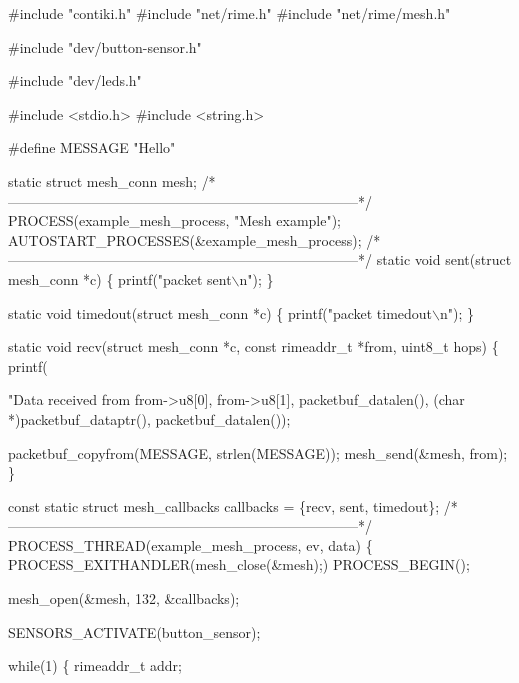 \begin{DoxyCodeInclude}
\textcolor{preprocessor}{#include "contiki.h"}
\textcolor{preprocessor}{#include "net/rime.h"}
\textcolor{preprocessor}{#include "net/rime/mesh.h"}

\textcolor{preprocessor}{#include "dev/button-sensor.h"}

\textcolor{preprocessor}{#include "dev/leds.h"}

\textcolor{preprocessor}{#include <stdio.h>}
\textcolor{preprocessor}{#include <string.h>}

\textcolor{preprocessor}{#define MESSAGE "Hello"}

\textcolor{keyword}{static} \textcolor{keyword}{struct }mesh\_conn mesh;
\textcolor{comment}{/*---------------------------------------------------------------------------*/}
PROCESS(example\_mesh\_process, \textcolor{stringliteral}{"Mesh example"});
AUTOSTART\_PROCESSES(&example\_mesh\_process);
\textcolor{comment}{/*---------------------------------------------------------------------------*/}
\textcolor{keyword}{static} \textcolor{keywordtype}{void}
sent(\textcolor{keyword}{struct} mesh\_conn *c)
\{
  printf(\textcolor{stringliteral}{"packet sent\(\backslash\)n"});
\}

\textcolor{keyword}{static} \textcolor{keywordtype}{void}
timedout(\textcolor{keyword}{struct} mesh\_conn *c)
\{
  printf(\textcolor{stringliteral}{"packet timedout\(\backslash\)n"});
\}

\textcolor{keyword}{static} \textcolor{keywordtype}{void}
recv(\textcolor{keyword}{struct} mesh\_conn *c, \textcolor{keyword}{const} rimeaddr\_t *from, uint8\_t hops)
\{
  printf(\textcolor{stringliteral}{"Data received from %
         from->u8[0], from->u8[1],
         packetbuf\_datalen(), (\textcolor{keywordtype}{char} *)packetbuf\_dataptr(), packetbuf\_datalen());

  packetbuf\_copyfrom(MESSAGE, strlen(MESSAGE));
  mesh\_send(&mesh, from);
\}

\textcolor{keyword}{const} \textcolor{keyword}{static} \textcolor{keyword}{struct }mesh\_callbacks callbacks = \{recv, sent, timedout\};
\textcolor{comment}{/*---------------------------------------------------------------------------*/}
PROCESS\_THREAD(example\_mesh\_process, ev, data)
\{
  PROCESS\_EXITHANDLER(mesh\_close(&mesh);)
  PROCESS\_BEGIN();

  mesh\_open(&mesh, 132, &callbacks);

  SENSORS\_ACTIVATE(button\_sensor);

  \textcolor{keywordflow}{while}(1) \{
    rimeaddr\_t addr;

}
\end{DoxyCodeInclude}
